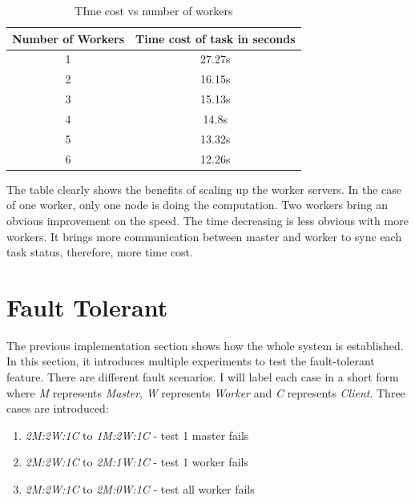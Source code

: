 \documentclass[runningheads,a4paper]{llncs}
\begin{document}
\begin{table}[htp]
\caption{TIme cost vs number of workers}
\begin{center}
\begin{tabular}{|c|c|}
\hline
Number of Workers & Time cost of task in seconds \\ \hline
1                 & 27.27s                       \\ \hline
2                 & 16.15s                       \\ \hline
3                 & 15.13s                       \\ \hline
4                 & 14.8s                        \\ \hline
5                 & 13.32s                       \\ \hline
6                 & 12.26s                       \\ \hline
\end{tabular}
\end{center}
\label{default}
\end{table}%

The table clearly shows the benefits of scaling up the worker servers. In the case of one worker, only one node is doing the computation. Two workers bring an obvious improvement on the speed. The time decreasing is less obvious with more workers. It brings more communication between master and worker to sync each task status, therefore, more time cost.

\section{Fault Tolerant}

The previous implementation section shows how the whole system is established. In this section, it introduces multiple experiments to test the fault-tolerant feature. There are different fault scenarios. I will label each case in a short form where \emph{M} represents \emph{Master}, \emph{W} represents \emph{Worker} and \emph{C} represents \emph{Client}. Three cases are introduced:

\begin{enumerate}
\item  \emph{2M:2W:1C} to \emph{1M:2W:1C} - test 1 master fails
\item  \emph{2M:2W:1C} to \emph{2M:1W:1C} - test 1 worker fails
\item  \emph{2M:2W:1C} to \emph{2M:0W:1C} - test all worker fails
\end{enumerate}
\end{document}
